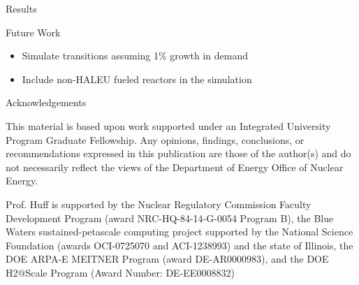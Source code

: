 \documentclass[final]{beamer}
\newlength{\onecolwid}
\newlength{\threecolwid}
\begin{document}
\begin{frame}[t]
\begin{columns}[t,totalwidth=\threecolwid]
\begin{column}{\onecolwid}
\begin{block}{Results}
\end{block}

\begin{alertblock}{Future Work }
\begin{itemize}
		\item Simulate transitions assuming 1\% growth in demand
		\item Include non-\gls{HALEU} fueled reactors in the simulation
\end{itemize}

\end{alertblock}




\begin{block}{Acknowledgements}
	
	This material is based upon work supported under an Integrated University 
Program Graduate Fellowship. Any opinions, findings, conclusions, or 
recommendations expressed in this publication are those of the author(s) 
and do not necessarily reflect the views of the Department of Energy Office 
of Nuclear Energy.

Prof. Huff is supported by the Nuclear Regulatory Commission Faculty
Development Program (award NRC-HQ-84-14-G-0054 Program B), the Blue Waters
sustained-petascale computing project supported by the National Science
Foundation (awards OCI-0725070 and ACI-1238993) and the state of Illinois, the
DOE ARPA-E MEITNER Program (award DE-AR0000983), and the DOE H2@Scale Program
(Award Number: DE-EE0008832)
	
\end{block}




\end{column}
\end{columns}
\end{frame}
\end{document}
